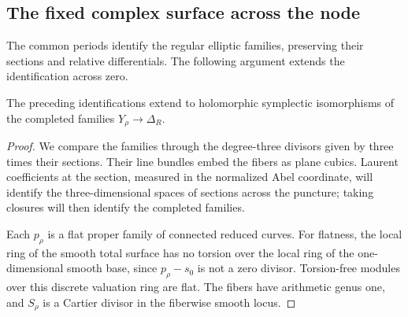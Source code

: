 \subsection{The fixed complex surface across the node}

The common periods identify the regular elliptic families,
preserving their sections and relative differentials.
The following argument extends the identification across zero.

\begin{lemma}\label{lem:nodal-fixed-family}
The preceding identifications extend to holomorphic symplectic
isomorphisms of the completed families \(Y_\rho\to\Delta_R\).
\end{lemma}
\begin{proof}
We compare the families through the degree-three divisors given by
three times their sections.  Their line bundles embed the fibers as
plane cubics.  Laurent coefficients at the section, measured in the
normalized Abel coordinate, will identify the three-dimensional spaces
of sections across the puncture; taking closures will then identify
the completed families.

Each \(p_\rho\) is a flat proper family of connected reduced curves.
For flatness, the local ring of the smooth total surface has no
torsion over the local ring of the one-dimensional smooth base,
since \(p_\rho-s_0\) is not a zero divisor.  Torsion-free modules
over this discrete valuation ring are flat.
The fibers have arithmetic genus one, and \(S_\rho\) is a Cartier
divisor in the fiberwise smooth locus.


\end{proof}
